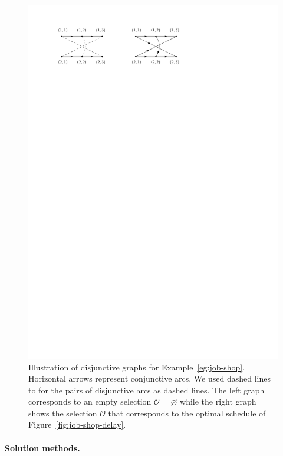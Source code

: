 \documentclass[a4paper]{report}
\theoremstyle{definition}
\theoremstyle{plain}
\begin{document}
\begin{figure}
  \centering
  \includegraphics[scale=1]{figures/disjunctive_graph.pdf}
  \caption{Illustration of disjunctive graphs for Example~\ref{eg:job-shop}.
    Horizontal arrows represent conjunctive arcs. We used dashed lines to for
    the pairs of disjunctive arcs as dashed lines. The left graph corresponds to
    an empty selection $\mathcal{O} = \varnothing$ while the right graph shows
    the selection $\mathcal{O}$ that corresponds to the optimal schedule of
    Figure~\ref{fig:job-shop-delay}.}
  \label{fig:disjunctive-graphs-job-shop}
\end{figure}


\paragraph{Solution methods.}
\end{document}
